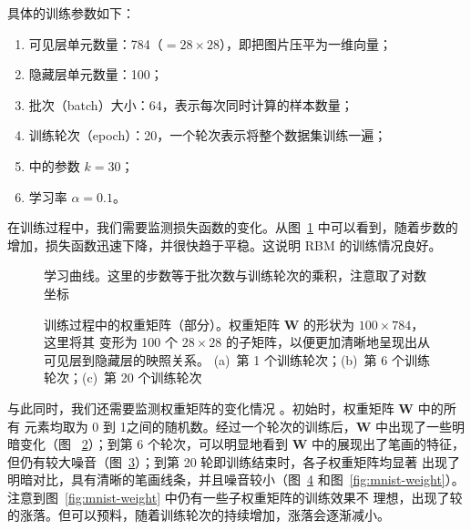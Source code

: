 具体的训练参数如下：

\begin{enumerate}
  \item 可见层单元数量：784（$=28 \times 28$），即把图片压平为一维向量；
  \item 隐藏层单元数量：100；
  \item 批次（batch）大小：64，表示每次同时计算的样本数量；
  \item 训练轮次（epoch）：20，一个轮次表示将整个数据集训练一遍；
  \item \CDk{} 中的参数 $k=30$；
  \item 学习率 $\alpha=0.1$。
\end{enumerate}

在训练过程中，我们需要监测损失函数的变化。从图~\ref{fig:learning-curve} 中可以看到，随着步数的
增加，损失函数迅速下降，并很快趋于平稳。这说明 RBM 的训练情况良好。

\begin{figure}[htb]
  \centering
  \caption{学习曲线。这里的步数等于批次数与训练轮次的乘积，注意取了对数坐标}
  \label{fig:learning-curve}
\end{figure}

\begin{figure}[htb]
  \centering
  \begin{subfigure}[b]{0.3\textwidth}
    \centering
    \caption{}
    \label{fig:mnist-weight-epoch-a}
  \end{subfigure}
  \begin{subfigure}[b]{0.3\textwidth}
    \centering
    \caption{}
    \label{fig:mnist-weight-epoch-b}
  \end{subfigure}
  \begin{subfigure}[b]{0.3\textwidth}
    \centering
    \caption{}
    \label{fig:mnist-weight-epoch-c}
  \end{subfigure}
  \caption{训练过程中的权重矩阵（部分）。权重矩阵 $\bm{W}$ 的形状为 $100 \times 784$，这里将其
    变形为 100 个 $28 \times 28$ 的子矩阵，以便更加清晰地呈现出从可见层到隐藏层的映照关系。
    (a)~第 1 个训练轮次；(b)~第 6 个训练轮次；(c)~第 20 个训练轮次}
  \label{fig:mnist-weight-epoch}
\end{figure}

与此同时，我们还需要监测权重矩阵的变化情况 \cite{lyy1994rbm}。初始时，权重矩阵 $\bm{W}$ 中的所有
元素均取为 0 到 1之间的随机数。经过一个轮次的训练后，$\bm{W}$ 中出现了一些明暗变化（图~%
\ref{fig:mnist-weight-epoch-a}）；到第 6 个轮次，可以明显地看到 $\bm{W}$ 中的展现出了笔画的特征，
但仍有较大噪音（图~\ref{fig:mnist-weight-epoch-b}）；到第 20 轮即训练结束时，各子权重矩阵均显著
出现了明暗对比，具有清晰的笔画线条，并且噪音较小（图~\ref{fig:mnist-weight-epoch-c}
和图~\ref{fig:mnist-weight}）。注意到图~\ref{fig:mnist-weight} 中仍有一些子权重矩阵的训练效果不
理想，出现了较的涨落。但可以预料，随着训练轮次的持续增加，涨落会逐渐减小。

